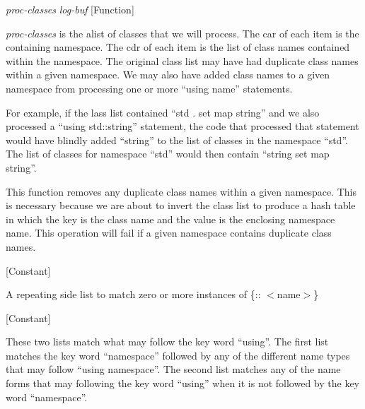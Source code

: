\vspace{1em}
\noindent
{}
\usebox{\funcname}\emph{proc-classes} \emph{log-buf}
 \hfill [Function]

\begin{doc-string}
\emph{proc-classes} is the alist of classes that we will process.  The car of each
item is the containing namespace.  The cdr of each item is the list of class
names contained within the namespace.  The original class list may have had
duplicate class names within a given namespace.  We may also have added class
names to a given namespace from processing one or more ``using name''
statements.

For example, if the lass list contained ``std . set map string'' and we also
processed a ``using std::string'' statement, the code that processed that
statement would have blindly added ``string'' to the list of classes in the
namespace ``std''.  The list of classes for namespace ``std'' would then contain
``string set map string''.

This function removes any duplicate class names within a given namespace.  This
is necessary because we are about to invert the class list to produce a hash
table in which the key is the class name and the value is the enclosing
namespace name.  This operation will fail if a given namespace contains
duplicate class names.
\end{doc-string}

\vspace{1em}
\noindent
{}
\usebox{\funcname}
 \hfill [Constant]

\begin{doc-string}
A repeating side list to match zero or more instances of \{:: $<$name$>$\}
\end{doc-string}

\vspace{1em}
\noindent
{}
\usebox{\funcname}
 \hfill [Constant]

\begin{doc-string}
These two lists match what may follow the key word ``using''.  The first list
matches the key word ``namespace'' followed by any of the different name types
that may follow ``using namespace''.  The second list matches any of the name
forms that may following the key word ``using'' when it is not followed by the
key word ``namespace''.
\end{doc-string}

